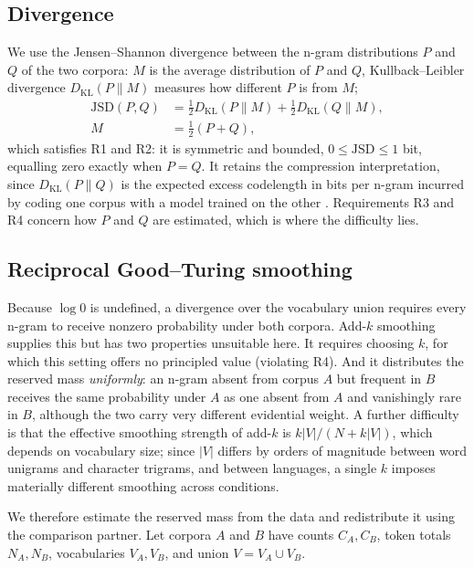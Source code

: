 \documentclass[conference]{IEEEtran}
\begin{document}
\subsection{Divergence}
We use the Jensen--Shannon divergence \cite{lin1991} between the n-gram
distributions $P$ and $Q$ of the two corpora: $M$ is the average distribution of $P$ and $Q$, Kullback–Leibler divergence $D_{\mathrm{KL}}(P \| M)$ measures how
different $P$ is from $M$;
\begin{equation}
\begin{split}
\mathrm{JSD}(P,Q) &= \tfrac{1}{2} D_{\mathrm{KL}}(P \| M)
                   + \tfrac{1}{2} D_{\mathrm{KL}}(Q \| M), \\
                 M &= \tfrac{1}{2}(P+Q),
\end{split}
\end{equation}
which satisfies R1 and R2: it is symmetric and bounded, $0 \le \mathrm{JSD} \le
1$ bit, equalling zero exactly when $P=Q$. It retains the compression
interpretation, since $D_{\mathrm{KL}}(P\|Q)$ is the expected excess codelength
in bits per n-gram incurred by coding one corpus with a model trained on the
other \cite{cover2006}. Requirements R3 and R4 concern how $P$ and $Q$ are
estimated, which is where the difficulty lies.

\subsection{Reciprocal Good--Turing smoothing}
\label{sec:rgt}

Because $\log 0$ is undefined, a divergence over the vocabulary union requires
every n-gram to receive nonzero probability under both corpora. Add-$k$ smoothing
supplies this but has two properties unsuitable here. It requires choosing $k$,
for which this setting offers no principled value (violating R4). And it
distributes the reserved mass \emph{uniformly}: an n-gram absent from corpus $A$
but frequent in $B$ receives the same probability under $A$ as one absent from
$A$ and vanishingly rare in $B$, although the two carry very different evidential
weight. A further difficulty is that the effective smoothing strength of add-$k$
is $k|V|/(N+k|V|)$, which depends on vocabulary size; since $|V|$ differs by
orders of magnitude between word unigrams and character trigrams, and between
languages, a single $k$ imposes materially different smoothing across conditions.

We therefore estimate the reserved mass from the data and redistribute it using
the comparison partner. Let corpora $A$ and $B$ have counts $C_A, C_B$, token
totals $N_A, N_B$, vocabularies $V_A, V_B$, and union $V = V_A \cup V_B$.
\end{document}
